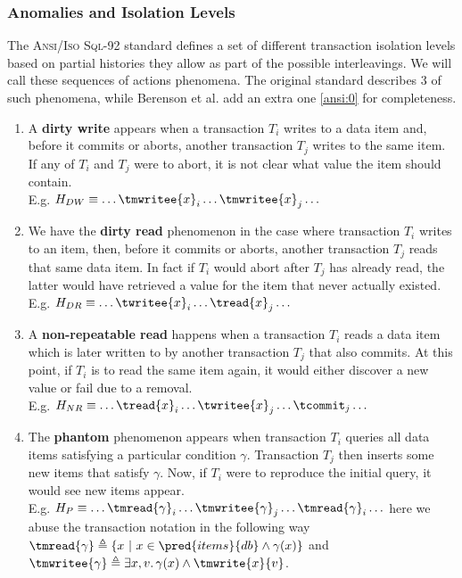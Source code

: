\tocless\subsubsection{Anomalies and Isolation Levels}

The \textsc{Ansi/Iso Sql-92} standard \cite{ansi92} defines a set of different transaction isolation levels based on partial histories they allow as part of the possible interleavings. We will call these sequences of actions phenomena. The original standard describes 3 of such phenomena, while Berenson et al. \cite{isolationansi} add an extra one \ref{ansi:0} for completeness.

\begin{enumerate}[label=(\textbf{P\arabic*})]\addtocounter{enumi}{-1}
\item \label{ansi:0} A \textbf{dirty write} appears when a transaction $T_i$ writes to a data item and, before it commits or aborts, another transaction $T_j$ writes to the same item. If any of $T_i$ and $T_j$ were to abort, it is not clear what value the item should contain.
\\
E.g. $H_{DW} \equiv \ldots \tmwritee{x}_i \ldots \tmwritee{x}_j \ldots$
\item We have the \textbf{dirty read} phenomenon in the case where transaction $T_i$ writes to an item, then, before it commits or aborts, another transaction $T_j$ reads that same data item. In fact if $T_i$ would abort after $T_j$ has already read, the latter would have retrieved a value for the item that never actually existed.
\\
E.g. $H_{DR} \equiv \ldots \twritee{x}_i \ldots \tread{x}_j \ldots$
\item A \textbf{non-repeatable read} happens when a transaction $T_i$ reads a data item which is later written to by another transaction $T_j$ that also commits. At this point, if $T_i$ is to read the same item again, it would either discover a new value or fail due to a removal.
\\
E.g. $H_{NR} \equiv \ldots \tread{x}_i \ldots \twritee{x}_j \ldots \tcommit_j \ldots$
\item The \textbf{phantom} phenomenon appears when transaction $T_i$ queries all data items satisfying a particular condition $\gamma$. Transaction $T_j$ then inserts some new items that satisfy $\gamma$. Now, if $T_i$ were to reproduce the initial query, it would see new items appear.
\\
E.g. $H_{P} \equiv \ldots \tmread{\gamma}_i \ldots \tmwritee{\gamma}_j \ldots \tmread{\gamma}_i \ldots$ here we abuse the transaction notation in the following way $\tmread{\gamma} \triangleq \left\lbrace x\ |\ x \in \pred{items}{db} \land \gamma(x) \right\rbrace$ and $\tmwritee{\gamma} \triangleq \exists x, v \ldotp \gamma(x) \land \tmwrite{x}{v}$.
\end{enumerate}

